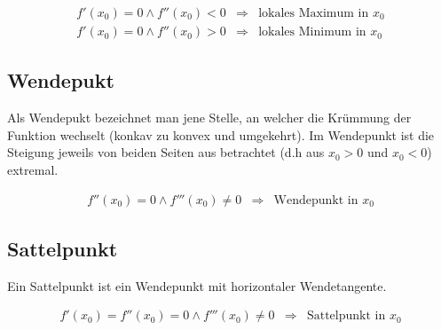 \[ \boxed{ \begin{matrix}
f'(x_0) = 0 \land f''(x_0) < 0 & \Rightarrow & \text{lokales Maximum in $x_0$} \\
f'(x_0) = 0 \land f''(x_0) > 0 & \Rightarrow & \text{lokales Minimum in $x_0$} 
\end{matrix} } \]

\subsection{Wendepukt}
Als Wendepukt bezeichnet man jene Stelle, an welcher die Krümmung der Funktion wechselt (konkav zu konvex und umgekehrt).
Im Wendepunkt ist die Steigung jeweils von beiden Seiten aus betrachtet (d.h aus $x_0 > 0$ und $x_0<0$) extremal.

\[ \boxed{ \begin{matrix}
f''(x_0) = 0 \land f'''(x_0) \neq 0 & \Rightarrow & \text{Wendepunkt in $x_0$}
\end{matrix} } \]

\subsection{Sattelpunkt}
Ein Sattelpunkt ist ein Wendepunkt mit horizontaler Wendetangente.

\[ \boxed{ \begin{matrix}
f'(x_0) =  f''(x_0) = 0 \land f'''(x_0) \neq 0 & \Rightarrow & \text{Sattelpunkt in $x_0$}
\end{matrix} } \]